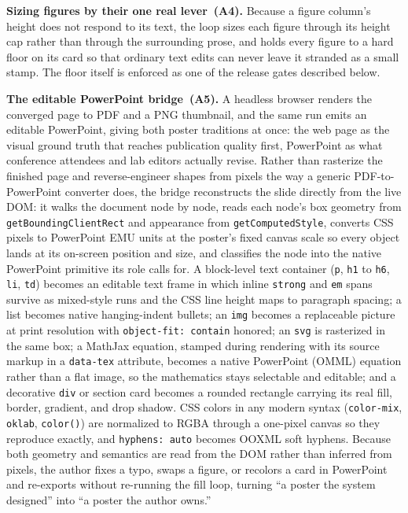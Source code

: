 \documentclass{article}
\begin{document}
\textbf{Sizing figures by their one real lever~(A4).} Because a figure column's height does not respond to its text, the loop sizes each figure through its height cap rather than through the surrounding prose, and holds every figure to a hard floor on its card so that ordinary text edits can never leave it stranded as a small stamp. The floor itself is enforced as one of the release gates described below.

\textbf{The editable PowerPoint bridge~(A5).} A headless browser renders the converged page to PDF and a PNG thumbnail, and the same run emits an editable PowerPoint, giving both poster traditions at once: the web page as the visual ground truth that reaches publication quality first, PowerPoint as what conference attendees and lab editors actually revise. Rather than rasterize the finished page and reverse-engineer shapes from pixels the way a generic PDF-to-PowerPoint converter does, the bridge reconstructs the slide directly from the live DOM: it walks the document node by node, reads each node's box geometry from \texttt{getBoundingClientRect} and appearance from \texttt{getComputedStyle}, converts CSS pixels to PowerPoint EMU units at the poster's fixed canvas scale so every object lands at its on-screen position and size, and classifies the node into the native PowerPoint primitive its role calls for. A block-level text container (\texttt{p}, \texttt{h1} to \texttt{h6}, \texttt{li}, \texttt{td}) becomes an editable text frame in which inline \texttt{strong} and \texttt{em} spans survive as mixed-style runs and the CSS line height maps to paragraph spacing; a list becomes native hanging-indent bullets; an \texttt{img} becomes a replaceable picture at print resolution with \texttt{object-fit: contain} honored; an \texttt{svg} is rasterized in the same box; a MathJax equation, stamped during rendering with its source markup in a \texttt{data-tex} attribute, becomes a native PowerPoint (OMML) equation rather than a flat image, so the mathematics stays selectable and editable; and a decorative \texttt{div} or section card becomes a rounded rectangle carrying its real fill, border, gradient, and drop shadow. CSS colors in any modern syntax (\texttt{color-mix}, \texttt{oklab}, \texttt{color()}) are normalized to RGBA through a one-pixel canvas so they reproduce exactly, and \texttt{hyphens: auto} becomes OOXML soft hyphens. Because both geometry and semantics are read from the DOM rather than inferred from pixels, the author fixes a typo, swaps a figure, or recolors a card in PowerPoint and re-exports without re-running the fill loop, turning ``a poster the system designed'' into ``a poster the author owns.''
\end{document}
